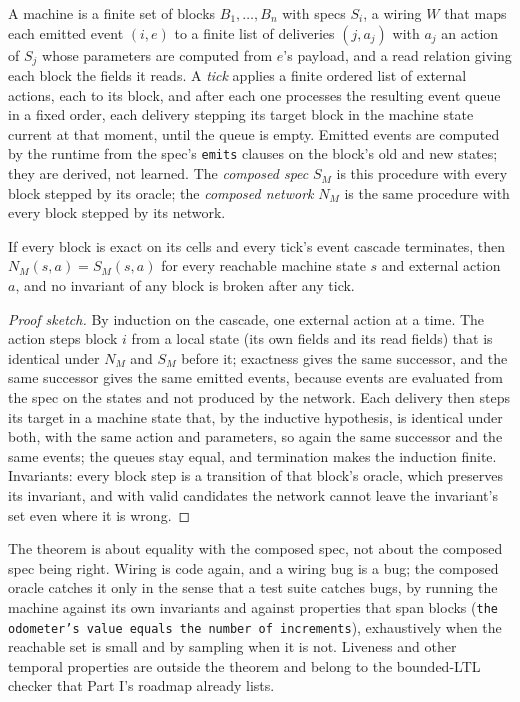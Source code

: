 \begin{definition}[Machine]
A machine is a finite set of blocks $B_1,\dots,B_n$ with specs $S_i$, a wiring $W$ that maps each emitted
event $(i,e)$ to a finite list of deliveries $(j,a_j)$ with $a_j$ an action of $S_j$ whose parameters are
computed from $e$'s payload, and a read relation giving each block the fields it reads. A \emph{tick} applies
a finite ordered list of external actions, each to its block, and after each one processes the resulting event
queue in a fixed order, each delivery stepping its target block in the machine state current at that moment,
until the queue is empty. Emitted events are computed by the runtime from the spec's \texttt{emits} clauses on
the block's old and new states; they are derived, not learned. The
\emph{composed spec} $S_M$ is this procedure with every block stepped by its oracle; the \emph{composed
network} $N_M$ is the same procedure with every block stepped by its network.
\end{definition}

\begin{theorem}
\label{thm:compose}
If every block is exact on its cells and every tick's event cascade terminates, then $N_M(s,a) = S_M(s,a)$ for
every reachable machine state $s$ and external action $a$, and no invariant of any block is broken after any
tick.
\end{theorem}

\begin{proof}[Proof sketch]
By induction on the cascade, one external action at a time. The action steps block $i$ from a local state
(its own fields and its read fields) that is identical under $N_M$ and $S_M$ before it; exactness gives the
same successor, and the same successor gives the same emitted events, because events are evaluated from the
spec on the states and not produced by the network. Each delivery then steps its target in a machine state that, by the inductive
hypothesis, is identical under both, with the same action and parameters, so again the same successor and the
same events; the queues stay equal, and termination makes the induction finite. Invariants: every block step is
a transition of that block's oracle, which preserves its invariant, and with valid candidates the network
cannot leave the invariant's set even where it is wrong.
\end{proof}

\begin{remark}
The theorem is about equality with the composed spec, not about the composed spec being right. Wiring is code
again, and a wiring bug is a bug; the composed oracle catches it only in the sense that a test suite catches
bugs, by running the machine against its own invariants and against properties that span blocks (\texttt{the
odometer's value equals the number of increments}), exhaustively when the reachable set is small and by
sampling when it is not. Liveness and other temporal properties are outside the theorem and belong to the
bounded-LTL checker that Part I's roadmap already lists.
\end{remark}

